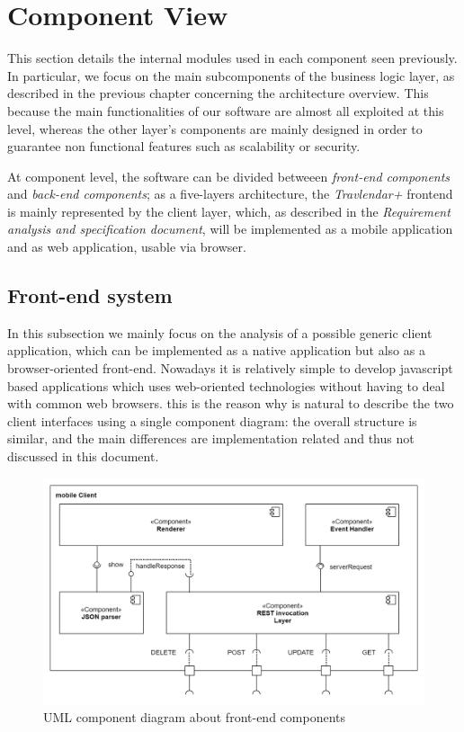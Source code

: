 \section{Component View}


This section details the internal modules used in each component seen previously.
In particular, we focus on the main subcomponents of the business logic layer, as described in the previous chapter concerning the architecture overview. 
This because the main functionalities  of our software are almost all exploited at this level, whereas the other layer's components are mainly
designed in order to guarantee non functional features such as scalability or security. 

At component level, the software can be divided betweeen \emph{front-end components} and \emph{back-end components}; as a five-layers architecture, the \emph{Travlendar+} frontend is mainly represented by the client layer, which, as described in the \emph{Requirement analysis and specification document}, will be implemented as a mobile application and as web application, usable via browser.
\subsection{Front-end system}
In this subsection we mainly focus on the analysis of a possible generic client application, which can be implemented as a native application but also as a browser-oriented front-end.
Nowadays it is relatively simple to develop javascript based applications which uses web-oriented technologies without having to deal with common web browsers. this is the reason why is
natural to describe the two client interfaces using a single component diagram: the overall structure is similar, and the main differences are implementation related and thus not
discussed in this document.
\begin{figure}[H]
    \centering
    \includegraphics[scale=0.2]{Pictures/ComponentDiagram/client_component.png}
    \caption{UML component diagram about front-end components}
    \label{component:client}
\end{figure}


